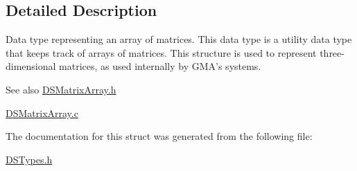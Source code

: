 \subsection{Detailed Description}
Data type representing an array of matrices. This data type is a utility data type that keeps track of arrays of matrices. This structure is used to represent three-\/dimensional matrices, as used internally by GMA's systems.

\begin{DoxySeeAlso}{See also}
\hyperlink{_d_s_matrix_array_8h}{DSMatrixArray.h} 

\hyperlink{_d_s_matrix_array_8c}{DSMatrixArray.c} 
\end{DoxySeeAlso}


The documentation for this struct was generated from the following file:\begin{DoxyCompactItemize}
\item 
\hyperlink{_d_s_types_8h}{DSTypes.h}\end{DoxyCompactItemize}
